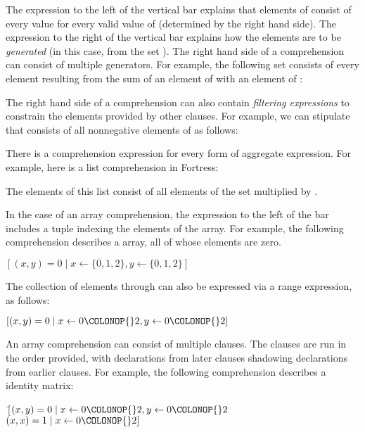 The expression to the left of the vertical bar
explains that elements of  consist of every value 
for every valid value of  (determined by the right hand side).
The expression to the right of the vertical bar
explains how the elements  are to be \emph{generated}
(in this case, from the set ).
The right hand side of a comprehension can consist of multiple generators.
For example, the following set consists of every element
resulting from the sum of an element of  with an element of :


The right hand side of a comprehension can also contain
\emph{filtering expressions} to constrain the elements provided by other clauses.
For example, we can stipulate that  consists of
all nonnegative elements of  as follows:


There is a comprehension expression for every form of aggregate expression.
For example, here is a list comprehension in Fortress:

The elements of this list consist of
all elements of the set  multiplied by .

In the case of an array comprehension, the expression to the left of the bar
includes a tuple indexing the elements of the array.
For example, the following comprehension describes a 
array, all of whose elements are zero.
\begin{Fortress}
\([(x,y) = 0 \mid x \leftarrow \{0,1,2\}, y \leftarrow \{0,1,2\}]\)
\end{Fortress}

The collection of elements  through  can also be expressed via a range expression, as follows:
\begin{Fortress}
\([(x,y) = 0 \mid x \leftarrow 0\COLONOP{}2, y \leftarrow 0\COLONOP{}2]\)
\end{Fortress}

An array comprehension can consist of multiple clauses. The clauses are run in the order provided,
with declarations from later clauses shadowing declarations from earlier clauses. For example, the following
comprehension describes a  identity matrix:

\begin{Fortress}
\(\ [ \)\pushtabs\=\+\((x,y) = 0 \mid x \leftarrow 0\COLONOP{}2, y \leftarrow 0\COLONOP{}2\)\\
\( (x,x) = 1 \mid x \leftarrow 0\COLONOP{}2]\)\-\\\poptabs
\end{Fortress}



